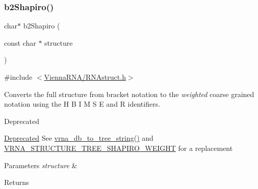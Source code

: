 \subsubsection{\texorpdfstring{b2Shapiro()}{b2Shapiro()}}
{\footnotesize\ttfamily char$\ast$ b2\+Shapiro (\begin{DoxyParamCaption}\item[{const char $\ast$}]{structure }\end{DoxyParamCaption})}



{\ttfamily \#include $<$\mbox{\hyperlink{RNAstruct_8h}{Vienna\+R\+N\+A/\+R\+N\+Astruct.\+h}}$>$}



Converts the full structure from bracket notation to the {\itshape weighted} coarse grained notation using the \textquotesingle{}H\textquotesingle{} \textquotesingle{}B\textquotesingle{} \textquotesingle{}I\textquotesingle{} \textquotesingle{}M\textquotesingle{} \textquotesingle{}S\textquotesingle{} \textquotesingle{}E\textquotesingle{} and \textquotesingle{}R\textquotesingle{} identifiers. 

\begin{DoxyRefDesc}{Deprecated}
\item[\mbox{\hyperlink{deprecated__deprecated000130}{Deprecated}}]See \mbox{\hyperlink{group__struct__utils__tree_ga56551ab7da64933a7230d29430f40cfe}{vrna\+\_\+db\+\_\+to\+\_\+tree\+\_\+string()}} and \mbox{\hyperlink{group__struct__utils__tree_ga91f2e3a3a502d5445fd7fe5983a5fe92}{V\+R\+N\+A\+\_\+\+S\+T\+R\+U\+C\+T\+U\+R\+E\+\_\+\+T\+R\+E\+E\+\_\+\+S\+H\+A\+P\+I\+R\+O\+\_\+\+W\+E\+I\+G\+HT}} for a replacement\end{DoxyRefDesc}



\begin{DoxyParams}{Parameters}
{\em structure} & \\
\hline
\end{DoxyParams}
\begin{DoxyReturn}{Returns}

\end{DoxyReturn}
\mbox{\label{group__struct__utils__deprecated_ga880d33066dd95441e5fbb73c57ed1c3e}} 
